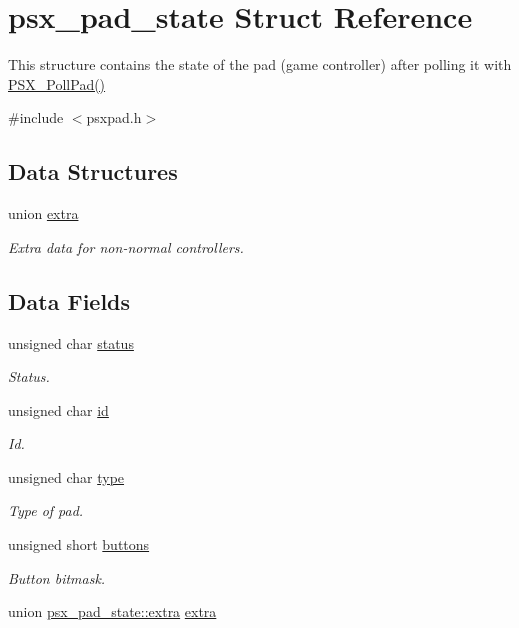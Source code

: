 \hypertarget{structpsx__pad__state}{}\section{psx\+\_\+pad\+\_\+state Struct Reference}
\label{structpsx__pad__state}


This structure contains the state of the pad (game controller) after polling it with \hyperlink{psx_8h_a3375af2214d2bb2d8694e65c586d3fa4}{P\+S\+X\+\_\+\+Poll\+Pad()}  




{\ttfamily \#include $<$psxpad.\+h$>$}

\subsection*{Data Structures}
\begin{DoxyCompactItemize}
\item 
union \hyperlink{unionpsx__pad__state_1_1extra}{extra}
\begin{DoxyCompactList}\small\item\em Extra data for non-\/normal controllers. \end{DoxyCompactList}\end{DoxyCompactItemize}
\subsection*{Data Fields}
\begin{DoxyCompactItemize}
\item 
unsigned char \hyperlink{structpsx__pad__state_ad8b7ccbbce9e28ca834162c302793bf5}{status}
\begin{DoxyCompactList}\small\item\em Status. \end{DoxyCompactList}\item 
unsigned char \hyperlink{structpsx__pad__state_a2dadce1fa3022f813bd1cab8523bd61b}{id}
\begin{DoxyCompactList}\small\item\em Id. \end{DoxyCompactList}\item 
unsigned char \hyperlink{structpsx__pad__state_a2241e697653b28ca45d2cbad682b7eba}{type}
\begin{DoxyCompactList}\small\item\em Type of pad. \end{DoxyCompactList}\item 
unsigned short \hyperlink{structpsx__pad__state_a26b197aa183a342446072509c0d1b800}{buttons}
\begin{DoxyCompactList}\small\item\em Button bitmask. \end{DoxyCompactList}\item 
union \hyperlink{unionpsx__pad__state_1_1extra}{psx\+\_\+pad\+\_\+state\+::extra} \hyperlink{structpsx__pad__state_a82998866e9a2516123c4b9974f598e9f}{extra}
\end{DoxyCompactItemize}


